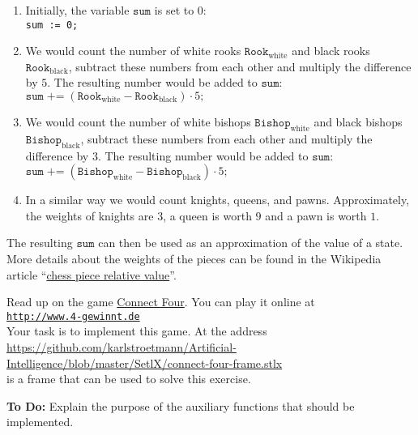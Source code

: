 \begin{enumerate}
\item Initially, the variable $\mathtt{sum}$ is set to $0$:
      \\[0.2cm]
      \hspace*{1.3cm}
      \texttt{sum := 0;}
\item We would count the number of white rooks $\mathtt{Rook}_{\mathrm{white}}$ and black rooks $\mathtt{Rook}_{\mathrm{black}}$,
      subtract these numbers from each other and multiply the difference by $5$.  
      The resulting number would be added to $\mathtt{sum}$:
      \\[0.2cm]
      \hspace*{1.3cm}
      $\mathtt{sum} \;\texttt{+=}\; (\mathtt{Rook}_{\mathrm{white}} - \mathtt{Rook}_{\mathrm{black}}) \cdot 5\mathtt{;}$
\item We would count the number of white bishops $\mathtt{Bishop}_{\mathrm{white}}$ and black bishops
      $\mathtt{Bishop}_{\mathrm{black}}$,
      subtract these numbers from each other and multiply the difference by $3$.  
      The resulting number would be added to $\mathtt{sum}$:
      \\[0.2cm]
      \hspace*{1.3cm}
      $\mathtt{sum} \;\texttt{+=}\; (\mathtt{Bishop}_{\mathrm{white}} - \mathtt{Bishop}_{\mathrm{black}}) \cdot 5\mathtt{;}$
\item In a similar way we would count knights, queens, and pawns.  Approximately, the weights of
      knights are $3$, a queen is worth $9$ and a pawn is worth $1$.
\end{enumerate}
The resulting $\mathtt{sum}$ can then be used as an approximation of the value of a state.
More details about the weights of the pieces can be found in the Wikipedia article 
``\href{https://en.wikipedia.org/wiki/Chess_piece_relative_value}{chess piece relative value}''.



\exercise
Read up on the game \href{https://en.wikipedia.org/wiki/Connect_Four}{Connect Four}.  You can play it online at
\\[0.2cm]
\hspace*{1.3cm}
\href{http://www.4-gewinnt.de}{\texttt{http://www.4-gewinnt.de}}
\\[0.2cm]
Your task is to implement this game.  At the address
\\[0.2cm]
\hspace*{1.3cm}
\href{https://github.com/karlstroetmann/Artificial-Intelligence/blob/master/SetlX/connect-four-frame.stlx}{https://github.com/karlstroetmann/Artificial-Intelligence/blob/master/SetlX/connect-four-frame.stlx}
\\[0.2cm]
is a frame that can be used to solve this exercise.

\noindent
\textbf{To Do:} Explain the purpose of the auxiliary functions that should be implemented.
\eox


